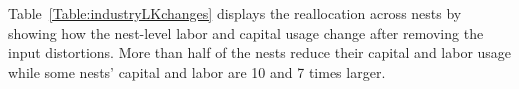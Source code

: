 \documentclass[12pt]{article}
\begin{document}


Table~\ref{Table:industryLKchanges} displays the reallocation across nests by showing how the nest-level labor and capital usage change after removing the input distortions. More than half of the nests reduce their capital and labor usage while some nests' capital and labor are 10 and 7 times larger.
\end{document}
